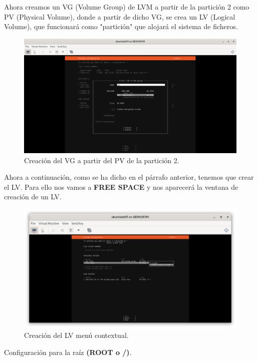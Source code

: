 Ahora creamos un VG (Volume Group) de LVM a partir de la partición 2 como PV (Physical Volume), donde a partir de dicho VG, se crea un LV (Logical Volume), que funcionará como "partición" que alojará el sistema de ficheros. 

\begin{figure}[H]
	\centering
	\includegraphics[scale=0.30]{09}
	\caption{Creación del VG a partir del PV de la partición 2.}
\end{figure}

Ahora a continuación, como se ha dicho en el párrafo anterior, tenemos que crear el LV. Para ello nos vamos a \textbf{FREE SPACE} y nos aparecerá la ventana de creación de un LV.

\begin{figure}[H]
	\centering
	\includegraphics[scale=0.40]{10}
	\caption{Creación del LV menú contextual.}
\end{figure}

Configuración para la raíz \textbf{(ROOT o /)}.

